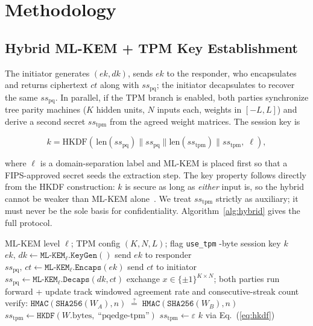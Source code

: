 \documentclass[conference]{IEEEtran}
\begin{document}
\section{Methodology}

\subsection{Hybrid ML-KEM + TPM Key Establishment}
\label{sec:hybrid}

The initiator generates $(ek, dk)$, sends $ek$ to the responder, who encapsulates
and returns ciphertext $ct$ along with $ss_{\mathrm{pq}}$; the initiator
decapsulates to recover the same $ss_{\mathrm{pq}}$. In parallel, if the TPM branch
is enabled, both parties synchronize tree parity machines ($K$ hidden units, $N$
inputs each, weights in $[-L,L]$) and derive a second secret $ss_{\mathrm{tpm}}$
from the agreed weight matrices. The session key is

\begin{equation}
k = \mathrm{HKDF}\!\left(\,\mathrm{len}(ss_{\mathrm{pq}})\|ss_{\mathrm{pq}}\|
\mathrm{len}(ss_{\mathrm{tpm}})\|ss_{\mathrm{tpm}},\;\ell\right),
\label{eq:hkdf}
\end{equation}

\noindent where $\ell$ is a domain-separation label and ML-KEM is placed first so
that a FIPS-approved secret seeds the extraction step. The key property follows
directly from the HKDF construction: $k$ is secure as long as \emph{either} input
is, so the hybrid cannot be weaker than ML-KEM alone~\cite{sp80056c}. We treat
$ss_{\mathrm{tpm}}$ strictly as auxiliary; it must never be the sole basis for
confidentiality. Algorithm~\ref{alg:hybrid} gives the full protocol.

\begin{algorithm}[t]
\small
\caption{Hybrid Key Establishment}
\label{alg:hybrid}
\begin{algorithmic}[1]
\REQUIRE ML-KEM level $\ell$; TPM config $(K,N,L)$; flag \texttt{use\_tpm}
-byte session key $k$
\STATE $ek,\,dk \leftarrow \texttt{ML-KEM}_\ell.\texttt{KeyGen}()$
\STATE send $ek$ to responder
\STATE $ss_{\mathrm{pq}},\,ct \leftarrow \texttt{ML-KEM}_\ell.\texttt{Encaps}(ek)$
\STATE send $ct$ to initiator
\STATE $ss_{\mathrm{pq}} \leftarrow \texttt{ML-KEM}_\ell.\texttt{Decaps}(dk,ct)$
  \REPEAT
    \STATE exchange $x \in \{{\pm}1\}^{K\times N}$; both parties run forward + update
    \STATE track windowed agreement rate and consecutive-streak count
  \STATE verify: $\texttt{HMAC}(\texttt{SHA256}(W_A),n)\;\stackrel{?}{=}\;\texttt{HMAC}(\texttt{SHA256}(W_B),n)$
  \STATE $ss_{\mathrm{tpm}} \leftarrow \texttt{HKDF}(W.\text{bytes},\;\text{``pqedge-tpm''})$
\ELSE
  \STATE $ss_{\mathrm{tpm}} \leftarrow \varepsilon$
\ENDIF
\RETURN $k$ via Eq.~(\ref{eq:hkdf})
\end{algorithmic}
\end{algorithm}
\end{document}
